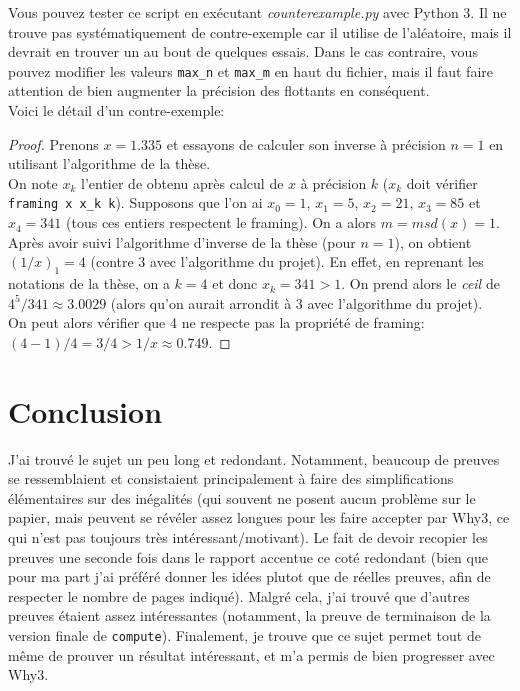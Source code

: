 \documentclass[a4paper]{article}%
\begin{document}
	Vous pouvez tester ce script en exécutant \textit{counterexample.py} avec Python 3. Il ne trouve pas systématiquement de contre-exemple
	car il utilise de l'aléatoire, mais il devrait en trouver un au bout de quelques essais. Dans le cas contraire, vous pouvez modifier
	les valeurs \texttt{max_n} et \texttt{max_m} en haut du fichier, mais il faut faire attention de bien
	augmenter la précision des flottants en conséquent.\\

	Voici le détail d'un contre-exemple:
	\begin{proof}
	Prenons $x=1.335$ et essayons de calculer son inverse à précision $n=1$ en utilisant l'algorithme de la thèse.\\

	On note $x_k$ l'entier de obtenu après calcul de $x$ à précision $k$ ($x_k$ doit vérifier \texttt{framing x x_k k}).
	Supposons que l'on ai $x_0=1$, $x_1=5$, $x_2=21$, $x_3=85$ et $x_4=341$ (tous ces entiers respectent le framing). On a alors $m=msd(x)=1$.\\

	Après avoir suivi l'algorithme d'inverse de la thèse (pour $n=1$), on obtient $(1/x)_1=4$ (contre $3$ avec l'algorithme du projet).
	En effet, en reprenant les notations de la thèse, on a $k=4$ et donc $x_k = 341 > 1$. On prend alors le \textit{ceil} de $4^5/341 \approx 3.0029$
	(alors qu'on aurait arrondit à $3$ avec l'algorithme du projet).\\

	On peut alors vérifier que 4 ne respecte pas la propriété de framing: $(4-1)/4 = 3/4 > 1/x \approx 0.749$.
	\end{proof}

	\section{Conclusion}

	J'ai trouvé le sujet un peu long et redondant. Notamment, beaucoup de preuves se ressemblaient et consistaient principalement
	à faire des simplifications élémentaires sur des inégalités (qui souvent ne posent aucun problème sur le papier,
	mais peuvent se révéler assez longues pour les faire accepter par Why3, ce qui n'est pas toujours très intéressant/motivant).
	Le fait de devoir recopier les preuves une seconde fois dans le rapport accentue ce coté redondant (bien que pour ma part
	j'ai préféré donner les idées plutot que de réelles preuves, afin de respecter le nombre de pages indiqué).
	Malgré cela, j'ai trouvé que d'autres preuves étaient assez intéressantes
	(notamment, la preuve de terminaison de la version finale de \texttt{compute}).
	Finalement, je trouve que ce sujet permet tout de même de prouver un résultat intéressant,
	et m'a permis de bien progresser avec Why3.\\
	
\end{document}
